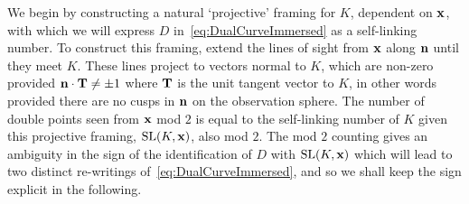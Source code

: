     We begin by constructing a natural `projective' framing for $K$, dependent on $\bf x$, with which we will express $D$ in~\eqref{eq:DualCurveImmersed} as a self-linking number. To construct this framing, extend the lines of sight from ${\bf x}$ along ${\bf n}$ until they meet $K$. These lines project to vectors normal to $K$, which are non-zero provided ${\bf n} \cdot {\bf T} \neq \pm 1$ where ${\bf T}$ is the unit tangent vector to $K$, in other words provided there are no cusps in ${\bf n}$ on the observation sphere. The number of double points seen from $\bf x$ mod $2$ is equal to the self-linking number of $K$ given this projective framing, $\mathrm{SL}(K,{\bf x})$, also mod $2$. The mod $2$ counting gives an ambiguity in the sign of the identification of $D$ with $\mathrm{SL}(K,{\bf x})$ which will lead to two distinct re-writings of~\eqref{eq:DualCurveImmersed}, and so we shall keep the sign explicit in the following. 

